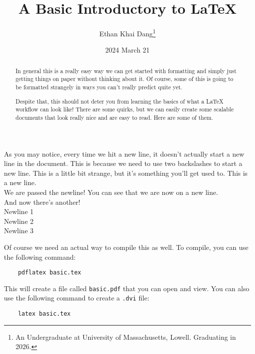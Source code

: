 \documentclass{article}
\title{A Basic Introductory to LaTeX}
\author{Ethan Khai Dang\thanks{An Undergraduate at University of Massachusetts, Lowell. Graduating in 2026.}}
\date{2024 March 21}
\begin{document}
\maketitle
\thispagestyle{empty} %
\newpage

\begin{abstract}
In general this is a really easy way we can get started with formatting and simply just getting things on paper without thinking about it.
Of course, some of this is going to be formatted strangely in ways you can't really predict quite yet.

Despite that, this should not deter you from learning the basics of what a LaTeX workflow can look like! There are some quirks,
but we can easily create some scalable documents that look really nice and are easy to read. Here are some of them.
\end{abstract}


As you may notice, every time we hit a new line, it doesn't actually start a new line in the document. This is because we need to use two backslashes to start a new line. This is a little bit strange, but it's something you'll get used to.
This is a new line.\\We are passed the newline! You can see that we are now on a new line.\\And now there's another!
\\Newline 1\\Newline 2\\Newline 3

Of course we need an actual way to compile this as well. To compile, you can use the following command:
\begin{verbatim}
    pdflatex basic.tex
\end{verbatim}

This will create a file called \texttt{basic.pdf} that you can open and view. You can also use the following command to create a \texttt{.dvi} file:
\begin{verbatim}
    latex basic.tex
\end{verbatim}
\end{document}
